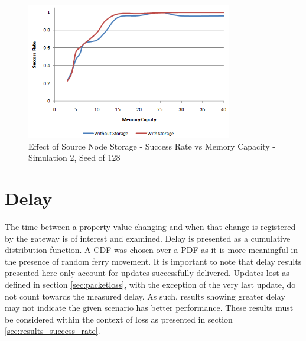
\begin{figure}[htbp]
    \centering
    \includegraphics[width=0.8\textwidth]{images/result_sccess_sim2byss_128}
    \caption{Effect of Source Node Storage - Success Rate vs Memory Capacity - Simulation 2, Seed of 128}
    \label{fig:result_sccess_sim2byss_128}
\end{figure}


\section{Delay}
\label{sec:results_delay}
The time between a property value changing and when that change is registered by the gateway is of interest and examined.
Delay is presented as a cumulative distribution function.
A CDF was chosen over a PDF as it is more meaningful in the presence of random ferry movement.
%
It is important to note that delay results presented here only account for updates successfully delivered.
Updates lost as defined in section \ref{sec:packetloss}, with the exception of the very last update, do not count towards the measured delay.
As such, results showing greater delay may not indicate the given scenario has better performance.
These results must be considered within the context of loss as presented in section \ref{sec:results_success_rate}.


